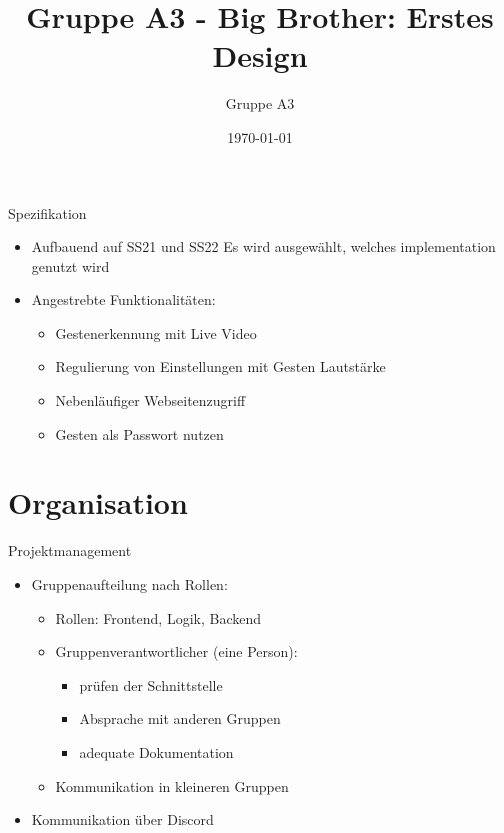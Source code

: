 \documentclass[xcolor=x11names,table]{beamer}
\title[\textcolor{white}{Erstes Design}]
{Gruppe A3 - Big Brother: Erstes Design}
\author{Gruppe A3}
\institute[TU Berlin]{TU Berlin}
\date{\today}
\begin{document}
\small
\begin{frame}
\titlepage
\end{frame}


\begin{frame}{Spezifikation}
\begin{itemize}
    \item Aufbauend auf SS21 und SS22
    \narrow Es wird ausgewählt, welches implementation genutzt
    wird
    \item Angestrebte Funktionalitäten:
    \begin{itemize}
        \item Gestenerkennung mit Live Video 
        \item Regulierung von Einstellungen mit Gesten
        \narrowB Lautstärke
        \item Nebenläufiger Webseitenzugriff
        \item Gesten als Passwort nutzen
    \end{itemize}
\end{itemize}
\end{frame}

\section{Organisation}%
\label{sec:Organisation}

\begin{frame}{Projektmanagement}
\begin{itemize}
    \item Gruppenaufteilung nach Rollen:
    \begin{itemize}
        \item Rollen: Frontend, Logik, Backend
        \item Gruppenverantwortlicher (eine Person):
        \begin{itemize}
            \item prüfen der Schnittstelle
            \item Absprache mit anderen Gruppen
            \item adequate Dokumentation
        \end{itemize}
        \item Kommunikation in kleineren Gruppen
    \end{itemize}
    \item Kommunikation über Discord
\end{itemize}
\end{frame}
\end{document}
